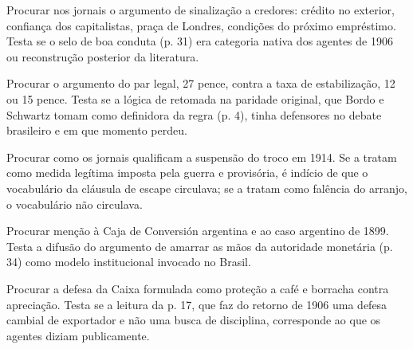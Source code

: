 \begin{dialogo}
\item Procurar nos jornais o argumento de sinalização a credores: crédito no
exterior, confiança dos capitalistas, praça de Londres, condições do próximo
empréstimo. Testa se o selo de boa conduta (p. 31) era categoria nativa dos
agentes de 1906 ou reconstrução posterior da literatura.
\item Procurar o argumento do par legal, 27 pence, contra a taxa de
estabilização, 12 ou 15 pence. Testa se a lógica de retomada na paridade
original, que Bordo e Schwartz tomam como definidora da regra (p. 4), tinha
defensores no debate brasileiro e em que momento perdeu.
\item Procurar como os jornais qualificam a suspensão do troco em 1914. Se a
tratam como medida legítima imposta pela guerra e provisória, é indício de que
o vocabulário da cláusula de escape circulava; se a tratam como falência do
arranjo, o vocabulário não circulava.
\item Procurar menção à Caja de Conversión argentina e ao caso argentino de
1899. Testa a difusão do argumento de amarrar as mãos da autoridade monetária
(p. 34) como modelo institucional invocado no Brasil.
\item Procurar a defesa da Caixa formulada como proteção a café e borracha
contra apreciação. Testa se a leitura da p. 17, que faz do retorno de 1906 uma
defesa cambial de exportador e não uma busca de disciplina, corresponde ao que
os agentes diziam publicamente.
\end{dialogo}



